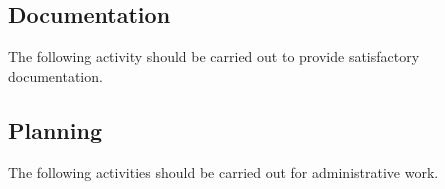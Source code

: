 \subsection{Documentation}
The following activity should be carried out to provide satisfactory documentation.
\begin{LIPSaktivitetslista}
\end{LIPSaktivitetslista}

\subsection{Planning}
The following activities should be carried out for administrative work.
\begin{LIPSaktivitetslista}
\end{LIPSaktivitetslista}


